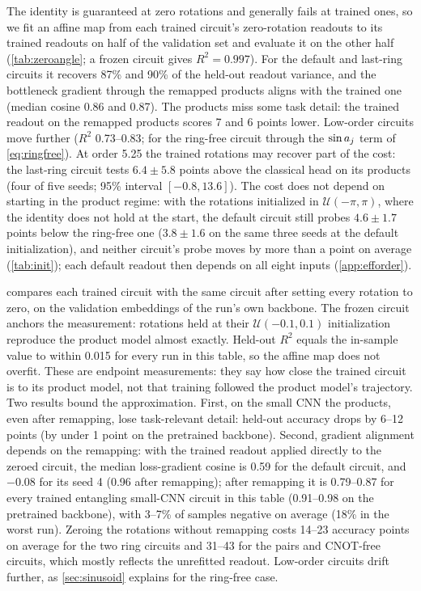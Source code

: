 The identity is guaranteed at zero rotations and generally fails at trained ones, so we fit an affine map from each trained circuit's
zero-rotation readouts to its trained readouts on half of the validation set and evaluate it on
the other half (\cref{tab:zeroangle}; a frozen circuit gives $R^2=0.997$). For the default and
last-ring circuits it recovers 87\% and 90\% of the held-out readout variance, and the bottleneck
gradient through the remapped products aligns with the trained one (median cosine 0.86 and
0.87). The products miss some task detail: the trained readout on the remapped products scores
7 and 6 points lower. Low-order circuits move further ($R^2$ 0.73--0.83; for the ring-free
circuit through the $\sin a_{j}$ term of \cref{eq:ringfree}). At order 5.25 the trained rotations
may recover part of the cost: the last-ring circuit tests $6.4\pm5.8$ points above the classical
head on its products (four of five seeds; 95\% interval $[-0.8,13.6]$). The cost does not depend on starting in the product regime: with the
rotations initialized in $\mathcal{U}(-\pi,\pi)$, where the identity does not hold at the start,
the default circuit still probes $4.6\pm1.7$ points below the ring-free one ($3.8\pm1.6$ on the
same three seeds at the default initialization), and neither circuit's probe moves by more
than a point on average (\cref{tab:init}); each default readout then depends on all eight
inputs (\cref{app:efforder}).




 compares each trained circuit with the same circuit after setting every
rotation to zero, on the validation embeddings of the run's own backbone. The frozen circuit
anchors the measurement: rotations held at their $\mathcal{U}(-0.1,0.1)$ initialization
reproduce the product model almost exactly. Held-out $R^2$ equals the in-sample value to
within 0.015 for every run in this table, so the affine map does not overfit. These are endpoint
measurements: they say how close the trained circuit is to its product model, not that
training followed the product model's trajectory. Two results bound the approximation.
First, on the small CNN the products, even after remapping, lose task-relevant detail: held-out
accuracy drops by 6--12 points (by under 1 point on the pretrained backbone). Second, gradient alignment depends on the remapping: with the trained
readout applied directly to the zeroed circuit, the median loss-gradient cosine is 0.59 for
the default circuit, and $-0.08$ for its seed 4 (0.96 after remapping); after remapping it is
0.79--0.87 for every trained entangling small-CNN circuit in this table (0.91--0.98 on the pretrained backbone), with 3--7\% of samples negative on average (18\% in
the worst run). Zeroing the
rotations without remapping costs 14--23 accuracy points on average for the two ring circuits
and 31--43 for the pairs and CNOT-free circuits, which mostly reflects the unrefitted readout. Low-order circuits drift further, as \cref{sec:sinusoid} explains for the
ring-free case.

